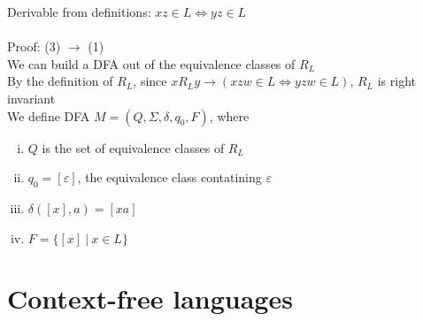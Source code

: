 \documentclass{article}
\newcommand*{\<}{\langle}
\renewcommand*{\>}{\rangle}
\begin{document}
			Derivable from definitions: $xz \in L \iff yz \in L$ \\
			\\
			Proof: (3) $\to$ (1) \\
			We can build a DFA out of the equivalence classes of $R_L$ \\
			By the definition of $R_L$, since $xR_Ly \to (xzw \in L \iff yzw \in L)$, $R_L$ is right invariant \\
			We define DFA $M = (Q, \Sigma, \delta, q_0, F)$, where
			\begin{enumerate}[(i)]
				\item $Q$ is the set of equivalence classes of $R_L$
				\item $q_0 = [\varepsilon]$, the equivalence class contatining $\varepsilon$
				\item $\delta([x], a) = [xa]$
				\item $F = \{[x]\:|\:x \in L\}$
				\end{enumerate}
		\clearpage

	\section{Context-free languages}
\end{document}
